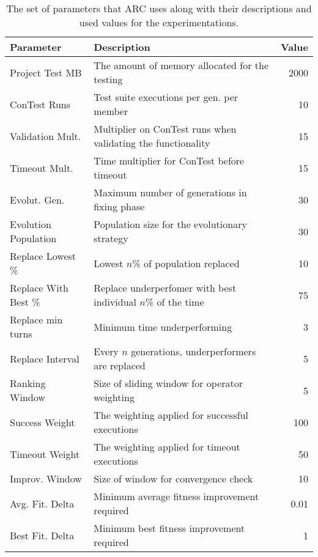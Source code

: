 \begin{table}%
\caption{The set of parameters that ARC uses along with their descriptions and
used values for the experimentations.}
\begin{center}
\lstset{basicstyle=\scriptsize}
\begin{tabular}{|l|l|r|}
\hline
\textbf{Parameter} & \textbf{Description} & \textbf{Value}\\
\hline
Project Test MB & The amount of memory allocated for the testing & 2000\\
\hline
ConTest Runs & Test suite executions per gen. per member & 10\\
\hline
Validation Mult. & Multiplier on ConTest runs when validating the functionality & 15\\
\hline
Timeout Mult. & Time multiplier for ConTest before timeout & 15\\
\hline
Evolut. Gen. & Maximum number of generations in fixing phase & 30\\
\hline
Evolution Population & Population size for the evolutionary strategy & 30\\
\hline
Replace Lowest \% & Lowest $n$\% of population replaced & 10\\
\hline
Replace With Best \% & Replace underperfomer with best individual $n$\% of the time & 75\\
\hline
Replace min turns & Minimum time underperforming & 3\\
\hline
Replace Interval & Every $n$ generations, underperformers are replaced & 5\\
\hline
Ranking Window & Size of sliding window for operator weighting & 5\\
\hline
Success Weight & The weighting applied for successful executions & 100\\
\hline
Timeout Weight & The weighting applied for timeout executions & 50\\
\hline
Improv. Window & Size of window for convergence check & 10\\
\hline
Avg. Fit. Delta & Minimum average fitness improvement required & 0.01\\
\hline
Best Fit. Delta & Minimum best fitness improvement required & 1\\
\hline
\end{tabular}
\label{tbl:used_parameters}
\end{center}
\end{table}

